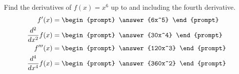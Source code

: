 \documentclass{ximera}
\author{Gregory Hartman \and Matthew Carr}
\begin{document}
\begin{exercise}




Find the derivatives of $f(x)=x^6$ up to and including the fourth derivative.
\begin{align*} 
f'(x)&=
\begin{prompt}
\answer{6x^5}
\end{prompt}\\
\frac{d^2}{dx^2}f(x)&=
\begin{prompt} 
\answer{30x^4}
\end{prompt}\\
f'''(x) &=
\begin{prompt} 
\answer{120x^3}
\end{prompt}\\
\frac{d^4}{dx^4}f(x) &=
\begin{prompt} 
\answer{360x^2}
\end{prompt}
\end{align*}

\end{exercise}
\end{document}

